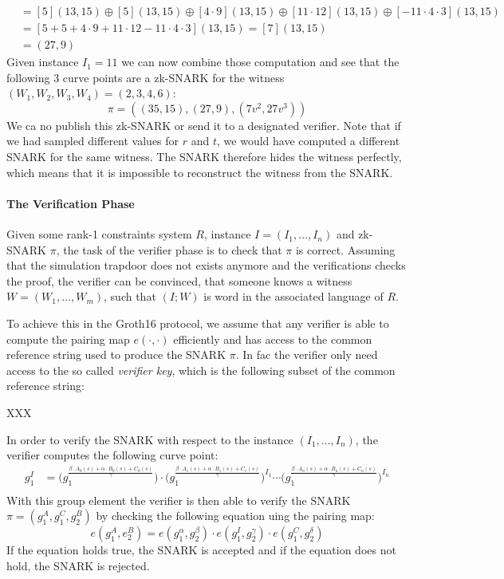 \begin{example}
\begin{align*}
       & = [5](13,15)\oplus [5](13,15) \oplus [4\cdot 9](13,15) \oplus [11\cdot 12](13,15) \oplus [-11\cdot 4\cdot 3](13,15)\\    
       & = [5+5+4\cdot 9+11\cdot 12-11\cdot 4\cdot 3](13,15)=[7](13,15)\\
       & = (27,9)
\end{align*}
Given instance $I_1=11$ we can now combine those computation and see that the following $3$ curve points are a zk-SNARK for the witness $(W_1,W_2,W_3,W_4)=(2,3,4,6)$:
$$
\pi=((35,15),(27,9),(7v^2,27v^3))
$$
We ca no publish this zk-SNARK or send it to a designated verifier. Note that if we had sampled different values for $r$ and $t$, we would have computed a different SNARK for the same witness. The SNARK therefore hides the witness perfectly, which means that it is impossible to reconstruct the witness from the SNARK.
\end{example}

\paragraph{The Verification Phase}Given some rank-1 constraints system $R$, instance $I=(I_1,\ldots, I_n)$ and zk-SNARK $\pi$, the task of the verifier phase is to check that $\pi$ is correct. Assuming that the simulation trapdoor does not exists anymore and the verifications checks the proof, the verifier can be convinced, that someone knows a witness $W=(W_1,\ldots,W_m)$, such that $(I;W)$ is word in the associated language of $R$.  

To achieve this in the Groth16 protocol, we assume that any verifier is able to compute the pairing map $e(\cdot,\cdot)$ efficiently and has access to the common reference string used to produce the SNARK $\pi$. In fac the verifier only need access to the so called \textit{verifier key}, which is the following subset of the common reference string:

XXX 

In order to verify the SNARK with respect to the instance $(I_1,\ldots, I_n)$, the verifier computes the following curve point:
\begin{align*}
g_1^I & = \Big(g_1^{\frac{\beta\cdot A_{0}(s)+\alpha\cdot B_{0}(s)+C_{0}(s)}{\gamma}}\Big)\cdot \Big(g_1^{\frac{\beta\cdot A_{1}(s)+\alpha\cdot B_{1}(s)+C_{1}(s)}{\gamma}}\Big)^{I_1} \cdots \Big(g_1^{\frac{\beta\cdot A_{n}(s)+\alpha\cdot B_{n}(s)+C_{n}(s)}{\gamma}}\Big)^{I_n}\\
\end{align*}
With this group element the verifier is then able to verify the SNARK $\pi=(g_1^A,g_1^C,g_2^B)$ by checking the following equation uing the pairing map:
\begin{equation}
e(g_1^A, e_2^B) = e(g_1^\alpha,g_2^\beta)\cdot e(g_1^I,g_2^\gamma)\cdot e(g_1^C,g_2^\delta)
\end{equation}
If the equation holds true, the SNARK is accepted and if the equation does not hold, the SNARK is rejected.

